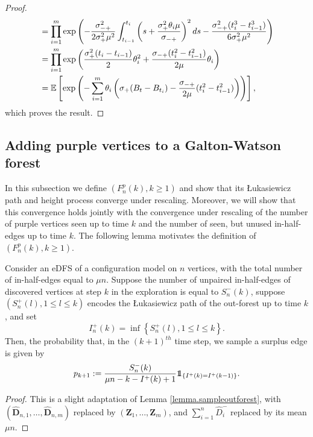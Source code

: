 \begin{proof}
\begin{align*}
     &= \prod_{i=1}^m  \exp\left( -\frac{\sigma_{-+}^2}{2\sigma_+^2 \mu^2}\int_{t_{i-1}}^{t_i}\left(s+\frac{\sigma_+^2\theta_i\mu}{\sigma_{-+}}\right)^2 ds - \frac{\sigma_{-+}^2 (t_i^3-t_{i-1}^3)}{6\sigma_+^2 \mu^2} \right)\\
     &=  \prod_{i=1}^m \exp\left(\frac{ \sigma_+^2 (t_i-t_{i-1}) }{2}\theta_i^2+\frac{\sigma_{-+} (t_i^2-t_{i-1}^2)}{2\mu}\theta_i \right)\\
     &={\mathbb E} \left[\exp\left(-\sum_{i=1}^m\theta_i\left(\sigma_+ (B_t-B_{t_i}) - \frac{\sigma_{-+}}{2\mu} (t_i^2-t_{i-1}^2)\right)\right)\right],
 \end{align*}
 which proves the result.
 \end{proof}
\subsection{Adding purple vertices to a Galton-Watson forest}\label{subsec.purpleleavesGWforest}
In this subsection we define $(F_n^p(k),k\geq 1)$  and show that its \L ukasiewicz path and height process converge under rescaling. Moreover, we will show that this convergence holds jointly with the convergence under rescaling of the number of purple vertices seen up to time $k$ and the number of seen, but unused in-half-edges up to time $k$. The following lemma motivates the definition of $(F_n^p(k),k\geq 1)$.
\begin{lemma}
Consider an eDFS of a configuration model on $n$ vertices, with the total number of in-half-edges equal to $\mu n$. Suppose the number of unpaired in-half-edges of discovered vertices at step $k$ in the exploration is equal to $S_n^{-}(k)$, suppose $(S_n^{+}(l),1\leq l\leq k)$ encodes the \L ukasiewicz path of the out-forest up to time $k$, and set $$I_n^{+}(k)=\inf\left\{S_n^{+}(l),1\leq l\leq k\right\}.$$
Then, the probability that, in the $(k+1)^{th}$ time step, we sample a surplus edge is given by
$$p_{k+1}:=\frac{S_n^{-}(k)}{\mu n - k -I^{+}(k)+1}\one_{\{I^{+}(k)=I^{+}(k-1)\}}.$$
\end{lemma}
\begin{proof}
This is a slight adaptation of Lemma \ref{lemma.sampleoutforest}, with $(\mathbf{\hat{D}}_{n,1},\dots,\mathbf{\hat{D}}_{n,m})$ replaced by $(\mathbf{Z}_1,\dots, \mathbf{Z}_m)$, and $\sum_{i=1}^n \hat{D}^-_i$ replaced by its mean $\mu n$.
\end{proof}

